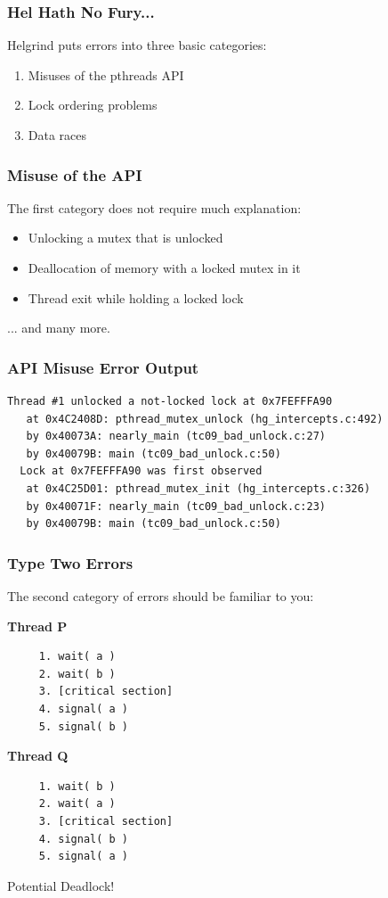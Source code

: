 \begin{frame}
\frametitle{Hel Hath No Fury...}

Helgrind puts errors into three basic categories:

\begin{enumerate}
	\item Misuses of the pthreads API
	\item Lock ordering problems
	\item Data races
\end{enumerate}


\end{frame}

\begin{frame}
\frametitle{Misuse of the API}

The first category does not require much explanation:


\begin{itemize}
	\item Unlocking a mutex that is unlocked
	\item Deallocation of memory with a locked mutex in it
	\item Thread exit while holding a locked lock
\end{itemize}
... and many more.


\end{frame}

\begin{frame}[fragile]
\frametitle{API Misuse Error Output}


\begin{verbatim}
Thread #1 unlocked a not-locked lock at 0x7FEFFFA90
   at 0x4C2408D: pthread_mutex_unlock (hg_intercepts.c:492)
   by 0x40073A: nearly_main (tc09_bad_unlock.c:27)
   by 0x40079B: main (tc09_bad_unlock.c:50)
  Lock at 0x7FEFFFA90 was first observed
   at 0x4C25D01: pthread_mutex_init (hg_intercepts.c:326)
   by 0x40071F: nearly_main (tc09_bad_unlock.c:23)
   by 0x40079B: main (tc09_bad_unlock.c:50)
\end{verbatim}

\end{frame}

\begin{frame}[fragile]
\frametitle{Type Two Errors}

The second category of errors should be familiar to you:

\begin{multicols}{2}
\textbf{Thread P}
  \begin{verbatim}
	 1. wait( a ) 
	 2. wait( b )
	 3. [critical section]
	 4. signal( a )
	 5. signal( b )
  \end{verbatim}
\columnbreak
\textbf{Thread Q}
  \begin{verbatim}
	 1. wait( b ) 
	 2. wait( a )
	 3. [critical section]
	 4. signal( b )
	 5. signal( a )
  \end{verbatim}
\end{multicols}
\vspace{-2em}

Potential Deadlock!

\end{frame}

